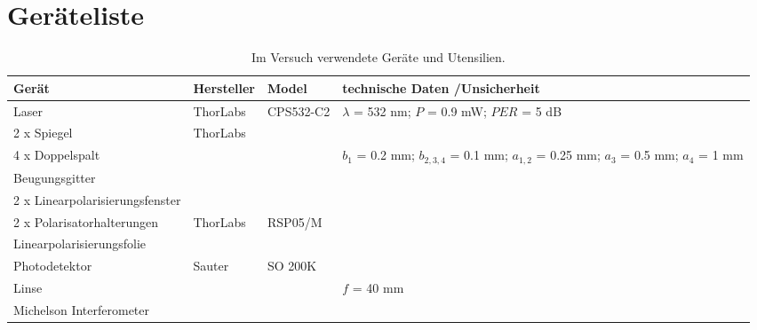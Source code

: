 \section{Geräteliste}
\label{sec:geraeteliste}
\begin{table}[H]
	\centering
	\caption{
		Im Versuch verwendete Geräte und Utensilien.}
	\begin{tabularx}{1.0\textwidth}{| l | l | l | X |}
		\hline
		Gerät       & Hersteller   & Model  & technische Daten /\linebreak Unsicherheit       \\\hline
		\hline
		Laser & ThorLabs & CPS532-C2 & $\lambda$ = 532 nm; $P$ = 0.9 mW; $PER$ = 5 dB\\ \hline
		2 x Spiegel & ThorLabs & \allc & \allc \\ \hline
		4 x Doppelspalt & \allc & \allc & $b_1$ = 0.2 mm; $b_{2,3,4}$ = 0.1 mm; $a_{1,2}$ = 0.25 mm; $a_3$ = 0.5 mm; $a_4$ = 1 mm \\ \hline
		Beugungsgitter & \allc & \allc & \allc \\ \hline
		2 x Linearpolarisierungsfenster & \allc & \allc & \allc \\ \hline
		2 x Polarisatorhalterungen & ThorLabs & RSP05/M & \allc \\ \hline
		Linearpolarisierungsfolie & \allc & \allc & \allc \\ \hline
		Photodetektor & Sauter & SO 200K & \allc \\ \hline
		Linse & \allc & \allc & $f$ = 40 mm \\ \hline
		Michelson Interferometer & \allc & \allc & \allc \\ \hline
	\end{tabularx}
	\label{tab:Geraeteliste}
\end{table}
\newpage